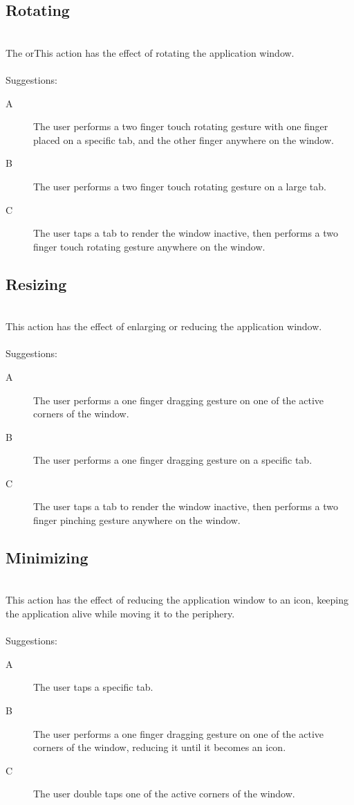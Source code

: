 \documentclass[11pt]{amsart}
\begin{document}
\subsection{Rotating}
\hfill\\
The orThis action has the effect of rotating the application window. 
\\\\
Suggestions:
\begin{description}
\item[A]{The user performs a two finger touch rotating gesture with one finger placed on a specific tab, and the other finger anywhere on the window.}
\item[B]{The user performs a two finger touch rotating gesture on a large tab.}
\item[C]{The user taps a tab to render the window inactive, then performs a two finger touch rotating gesture anywhere on the window.}
\end{description}

\subsection{Resizing}
\hfill\\
This action has the effect of enlarging or reducing the application window.
\\\\
Suggestions:
\begin{description}
\item[A]{The user performs a one finger dragging gesture on one of the active corners of the window.}
\item[B]{The user performs a one finger dragging gesture on a specific tab.}
\item[C]{The user taps a tab to render the window inactive, then performs a two finger pinching gesture anywhere on the window.}
\end{description}

\subsection{Minimizing}
\hfill\\
This action has the effect of reducing the application window to an icon, keeping the application alive while moving it to the periphery.
\\\\
Suggestions:
\begin{description}
\item[A]{The user taps a specific tab.}
\item[B]{The user performs a one finger dragging gesture on one of the active corners of the window, reducing it until it becomes an icon.}
\item[C]{The user double taps one of the active corners of the window.}
\end{description}
\end{document}
